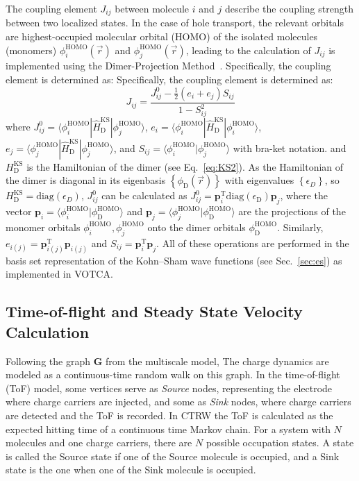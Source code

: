 \documentclass[%
 reprint,
superscriptaddress,
 amsmath,amssymb,
 aps,
prb,
floatfix
]{revtex4-2}
\begin{document}
The coupling element $J_{ij}$ between molecule $i$ and $j$ describe the coupling strength between two localized states. In the case of hole transport, the relevant orbitals are highest-occupied molecular orbital (HOMO) of the isolated molecules (monomers) $\phi^\text{HOMO}_i(\vec{r})$ and $\phi^\text{HOMO}_j(\vec{r})$, 
leading to the calculation of $J_{ij}$ is implemented using the Dimer-Projection Method~\cite{baumeier_density_2010}. Specifically, the coupling element is determined as:
Specifically, the coupling element is determined as: 
%
\begin{equation}
    J_{ij} = \frac{ J^0_{ij}- \frac{1}{2}(e_i+e_j) S_{ij} }{ 1- S_{ij}^2 }
    \label{equ:JAB}
\end{equation}
%
where $J^0_{ij} = \langle \phi^\text{HOMO}_i | \hat{H}^\text{KS}_\text{D} | \phi^\text{HOMO}_j \rangle $, $e_i = \langle \phi^\text{HOMO}_i | \hat{H}^\text{KS}_\text{D} | \phi^\text{HOMO}_i \rangle $, $e_j = \langle \phi^\text{HOMO}_j | \hat{H}^\text{KS}_\text{D} | \phi^\text{HOMO}_j \rangle $, and $S_{ij}=\langle \phi^\text{HOMO}_i | \phi^\text{HOMO}_j \rangle $ with bra-ket notation. 
and $H^\text{KS}_\text{D}$ is the Hamiltonian of the dimer (see Eq.~\ref{eq:KS2}). 
As the Hamiltonian of the dimer is diagonal in its eigenbasis $\left\{ \phi_\text{D}(\vec{r})\right\}$ with eigenvalues $\left\{ \epsilon_D\right\}$, so $H^\text{KS}_\text{D} = \text{diag}(\epsilon_D)$, $J^0_{ij}$ can be calculated as $J^0_{ij} = \mathbf{p}_i^\text{T} \text{diag}(\epsilon_\text{D}) \mathbf{p}_j$,  where the vector $\mathbf{p}_i = \langle \phi_i^\text{HOMO} | \phi^\text{HOMO}_\text{D} \rangle$ and $\mathbf{p}_j = \langle \phi_j^\text{HOMO} | \phi_\text{D}^\text{HOMO} \rangle$ are the projections of the monomer orbitals $\phi_i^\text{HOMO}, \phi_j^\text{HOMO}$ onto the dimer orbitals $\phi^\text{HOMO}_\text{D}$. Similarly, $e_{i(j)} = \mathbf{p}_{i(j)}^\text{T} \mathbf{p}_{i(j)}$ and $S_{ij} =  \mathbf{p}_i^\text{T} \mathbf{p}_j$. All  of these operations are performed in the basis set representation of the Kohn--Sham wave functions (see Sec.~\ref{sec:es}) as implemented in VOTCA.
\subsection{Time-of-flight and Steady State Velocity Calculation}
Following the graph $\mathbf{G}$ from the multiscale model,
The charge dynamics are modeled as a continuous-time random walk on this graph. In the time-of-flight (ToF) model, some vertices serve as \textit{Source} nodes, representing the electrode where charge carriers are injected, and some as \textit{Sink} nodes, where charge carriers are detected and the ToF is recorded.
In CTRW the ToF is calculated as the expected hitting time of a continuous time Markov chain.
For a system with $N$ molecules and one charge carriers, there are $N$ possible occupation states. A state is called the Source state if one of the Source molecule is occupied, and a Sink state is the one when one of the Sink molecule is occupied.
\end{document}
